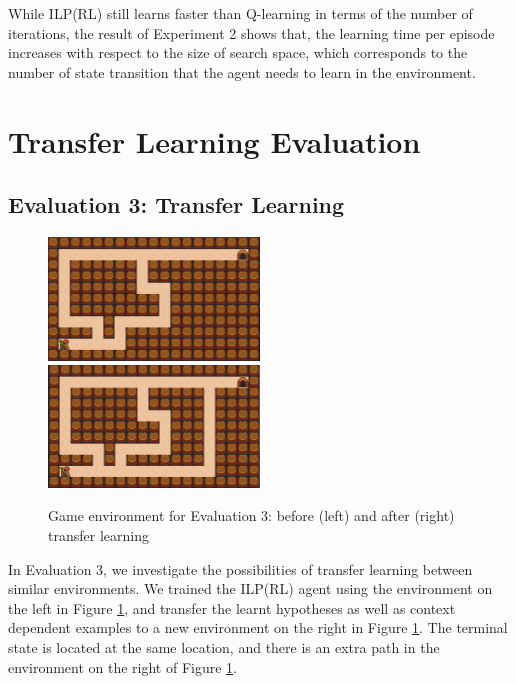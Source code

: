 While ILP(RL) still learns faster than Q-learning in terms of the number of iterations, 
the result of Experiment 2 shows that, the learning time per episode increases with respect to the size of search space, 
which corresponds to the number of state transition that the agent needs to learn in the environment.

\section{Transfer Learning Evaluation}
\label{sec:transfer_learning_evaluation}

\subsection{Evaluation 3: Transfer Learning}
\label{subsec:experiement3_setup}

\begin{figure}[!htb]
\centerline{
\includegraphics[width=0.5\textwidth]{./figures/experiment3_before}
\includegraphics[width=0.5\textwidth]{./figures/experiment3_after}
}
\caption{Game environment for Evaluation 3: before (left) and after (right) transfer learning}
\label{experiment3_setup}
\end{figure}

In Evaluation 3, we investigate the possibilities of transfer learning between similar environments.
We trained the ILP(RL) agent using the environment on the left in Figure \ref{experiment3_setup}, 
and transfer the learnt hypotheses as well as context dependent examples to a new environment on the right in Figure \ref{experiment3_setup}. The terminal state is located at the same location, and there is an extra path in the environment on the right of Figure \ref{experiment3_setup}.

